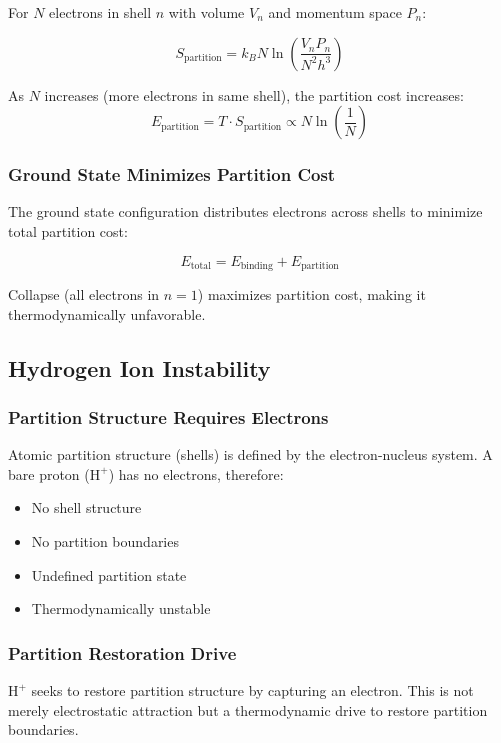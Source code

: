\documentclass[12pt,a4paper]{article}
\begin{document}
For $N$ electrons in shell $n$ with volume $V_n$ and momentum space $P_n$:

$$
S_{\text{partition}} = k_B N \ln\left(\frac{V_n P_n}{N^2 h^3}\right)
$$

As $N$ increases (more electrons in same shell), the partition cost increases:
$$
E_{\text{partition}} = T \cdot S_{\text{partition}} \propto N \ln\left(\frac{1}{N}\right)
$$

\subsubsection{Ground State Minimizes Partition Cost}

The ground state configuration distributes electrons across shells to minimize total partition cost:

$$
E_{\text{total}} = E_{\text{binding}} + E_{\text{partition}}
$$

Collapse (all electrons in $n=1$) maximizes partition cost, making it thermodynamically unfavorable.

\subsection{Hydrogen Ion Instability}

\subsubsection{Partition Structure Requires Electrons}

Atomic partition structure (shells) is defined by the electron-nucleus system. A bare proton ($\text{H}^+$) has no electrons, therefore:

\begin{itemize}
\item No shell structure
\item No partition boundaries
\item Undefined partition state
\item Thermodynamically unstable
\end{itemize}

\subsubsection{Partition Restoration Drive}

$\text{H}^+$ seeks to restore partition structure by capturing an electron. This is not merely electrostatic attraction but a thermodynamic drive to restore partition boundaries.
\end{document}
